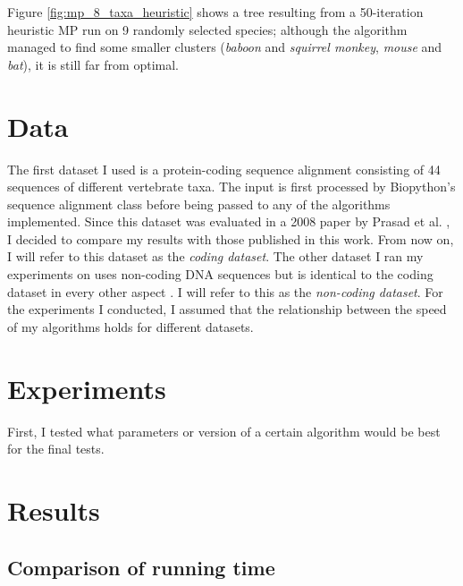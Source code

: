 \documentclass[11pt,twocolumn]{article}
\begin{document}
Figure \ref{fig:mp_8_taxa_heuristic} shows a tree resulting from a 50-iteration heuristic MP run on 9 randomly selected species; although the algorithm managed to find some smaller clusters (\textit{baboon} and \textit{squirrel monkey}, \textit{mouse} and \textit{bat}), it is still far from optimal.


\section{Data}

The first dataset I used is a protein-coding sequence alignment \cite{dataset} consisting of 44 sequences of different vertebrate taxa. The input is first processed by Biopython's sequence alignment class before being passed to any of the algorithms implemented. Since this dataset was evaluated in a 2008 paper by Prasad et al. \cite{Prasad2008}, I decided to compare my results with those published in this work. From now on, I will refer to this dataset as the \textit{coding dataset}. The other dataset I ran my experiments on uses non-coding DNA sequences but is identical to the coding dataset in every other aspect \cite{dataset}. I will refer to this as the \textit{non-coding dataset}. For the experiments I conducted, I assumed that the relationship between the speed of my algorithms holds for different datasets.

\section{Experiments}

First, I tested what parameters or version of a certain algorithm would be best for the final tests.

\section{Results}

\subsection{Comparison of running time}
\end{document}

